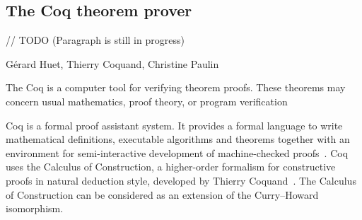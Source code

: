 \documentclass[article]{aaltoseries}
\begin{document}






\subsection{The Coq theorem prover}
\label{sec:prover_coq}

// TODO (Paragraph is still in progress)

Gérard Huet, Thierry Coquand, Christine Paulin

The Coq is a computer tool for verifying theorem proofs. These theorems may concern usual mathematics, proof theory, or program verification

Coq is a formal proof assistant system. It provides a formal language to write mathematical definitions, executable algorithms and theorems together with an environment for semi-interactive development of machine-checked proofs~\cite{tool_Coq}. Coq uses the Calculus of Construction, a higher-order formalism for constructive proofs in natural deduction style, developed by Thierry Coquand~\cite{Coq86}. 
The Calculus of Construction can be considered as an extension of the Curry–Howard isomorphism. %
\end{document}
